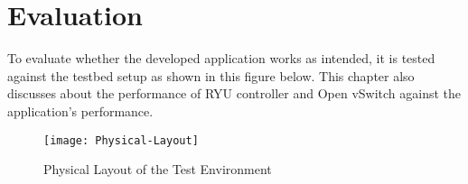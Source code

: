 \chapter{Evaluation}
To evaluate whether the developed application works as intended, it is tested against the testbed setup as shown in this figure below. This chapter also discusses about the performance of RYU controller and Open vSwitch against the application’s performance.

  \begin{figure}[H]
	\centering
	\texttt{[image: Physical-Layout]}
	\caption {Physical Layout of the Test Environment}
	\label{fig:test-layout}
	\vspace{-10pt}
  \end{figure}

